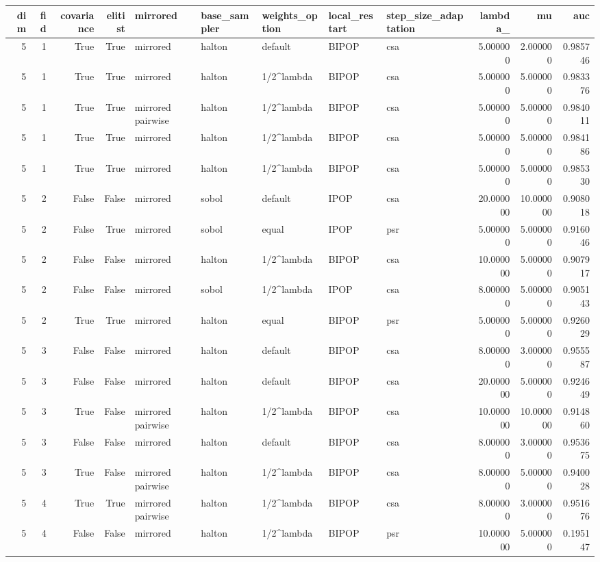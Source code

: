 \begin{tabular}{rrrrlllllrrr}
\toprule
dim & fid & covariance & elitist & mirrored & base_sampler & weights_option & local_restart & step_size_adaptation & lambda_ & mu & auc \\
\midrule
5 & 1 & True & True & mirrored & halton & default & BIPOP & csa & 5.000000 & 2.000000 & 0.985746 \\
5 & 1 & True & True & mirrored & halton & 1/2^lambda & BIPOP & csa & 5.000000 & 5.000000 & 0.983376 \\
5 & 1 & True & True & mirrored pairwise & halton & 1/2^lambda & BIPOP & csa & 5.000000 & 5.000000 & 0.984011 \\
5 & 1 & True & True & mirrored & halton & 1/2^lambda & BIPOP & csa & 5.000000 & 5.000000 & 0.984186 \\
5 & 1 & True & True & mirrored & halton & 1/2^lambda & BIPOP & csa & 5.000000 & 5.000000 & 0.985330 \\
5 & 2 & False & False & mirrored & sobol & default & IPOP & csa & 20.000000 & 10.000000 & 0.908018 \\
5 & 2 & False & True & mirrored & sobol & equal & IPOP & psr & 5.000000 & 5.000000 & 0.916046 \\
5 & 2 & False & False & mirrored & halton & 1/2^lambda & BIPOP & csa & 10.000000 & 5.000000 & 0.907917 \\
5 & 2 & False & False & mirrored & sobol & 1/2^lambda & IPOP & csa & 8.000000 & 5.000000 & 0.905143 \\
5 & 2 & True & True & mirrored & halton & equal & BIPOP & psr & 5.000000 & 5.000000 & 0.926029 \\
5 & 3 & False & False & mirrored & halton & default & BIPOP & csa & 8.000000 & 3.000000 & 0.955587 \\
5 & 3 & False & False & mirrored & halton & default & BIPOP & csa & 20.000000 & 5.000000 & 0.924649 \\
5 & 3 & True & False & mirrored pairwise & halton & 1/2^lambda & BIPOP & csa & 10.000000 & 10.000000 & 0.914860 \\
5 & 3 & False & False & mirrored & halton & default & BIPOP & csa & 8.000000 & 3.000000 & 0.953675 \\
5 & 3 & True & False & mirrored pairwise & halton & 1/2^lambda & BIPOP & csa & 8.000000 & 5.000000 & 0.940028 \\
5 & 4 & True & True & mirrored pairwise & halton & 1/2^lambda & BIPOP & csa & 8.000000 & 3.000000 & 0.951676 \\
5 & 4 & False & False & mirrored & halton & 1/2^lambda & BIPOP & psr & 10.000000 & 5.000000 & 0.195147 \\

\end{tabular}
